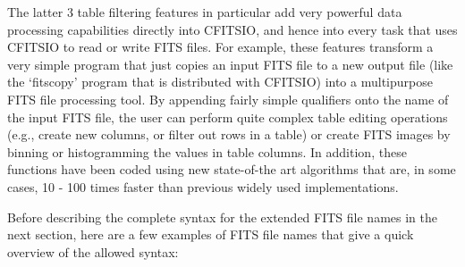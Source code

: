 \documentclass[11pt]{book}
\begin{document}
The latter 3 table filtering features in particular add very powerful
data processing capabilities directly into CFITSIO, and hence into
every task that uses CFITSIO to read or write FITS files.  For example,
these features transform a very simple program that just copies an
input FITS file to a new output file (like the `fitscopy' program that
is distributed with CFITSIO) into a multipurpose FITS file processing
tool.  By appending fairly simple qualifiers onto the name of the input
FITS file, the user can perform quite complex table editing operations
(e.g., create new columns, or filter out rows in a table) or create
FITS images by binning or histogramming the values in table columns.
In addition, these functions have been coded using new state-of-the art
algorithms that are, in some cases, 10 - 100 times faster than previous
widely used implementations.

Before describing the complete syntax for the extended FITS file names
in the next section, here are a few examples of FITS file names that
give a quick overview of the allowed syntax:
\end{document}
